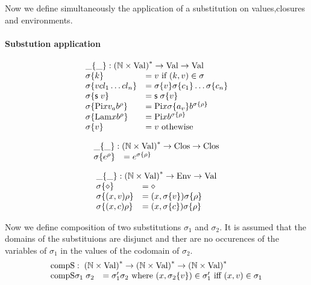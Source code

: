 Now we define simultaneously the application of a substitution on values,closures and environments.

\paragraph*{Substution application}
\[
\begin{array}{ll}
\multicolumn{2}{l}{\subst{\_}{\_} : \ves{(\cN \times \Val)} \ra \Val \ra \Val} \\
\subst{\sigma}{k} & = v \mbox{ if } (k,v) \in \sigma \\
\subst{\sigma}{v cl_1 \ldots cl_n} & = \subst{\sigma}{v} \substClos{\sigma}{c_1} \ldots \substClos{\sigma}{c_n}\\
\subst{\sigma}{\s v} & = \s \subst{\sigma}{v} \\
\subst{\sigma}{\vpi x v_a \cl{b}{\rho}} & = \vpi x \subst{\sigma}{a_v} \cl{b}{\subst{\sigma}{\rho}} \\
\subst{\sigma}{\vlam x \cl{b}{\rho}} & = \vpi x \cl{b}{\subst{\sigma}{\rho}} \\
\subst{\sigma}{v} & = v \mbox{ othewise }
\end{array}
\]

\[
\begin{array}{ll}
\multicolumn{2}{l}{\substClos{\_}{\_} : \ves{(\cN \times \Val)} \ra \Clos \ra \Clos} \\
\substClos{\sigma}{\cl{e}{\rho}} & = \cl{e}{\substEnv{\sigma}{\rho}} 
\end{array}
\]


\[
\begin{array}{ll}
\multicolumn{2}{l}{\substEnv{\_}{\_} : \ves{(\cN \times \Val)} \ra \Env \ra \Val} \\
\substEnv{\sigma}{\diamond} & = \diamond \\
\substEnv{\sigma}{(x,v)\rho} & = (x,\subst{\sigma}{v}) \substEnv{\sigma}{\rho} \\
\substEnv{\sigma}{(x,c)\rho} & = (x,\substClos{\sigma}{c}) \substEnv{\sigma}{\rho}
\end{array}
\]

Now we define composition of two substitutions $\sigma_1$ and $\sigma_2$.
It is assumed that the domains of the substituions are disjunct and
ther are no occurences of the variables of $\sigma_1$ in the values of the codomain of $\sigma_2$.  
\[
\begin{array}{ll}
\multicolumn{2}{l}{\compS : \ves{(\cN \times \Val)} \ra \ves{(\cN \times \Val)} \ra \ves{(\cN \times \Val)}} \\
\compS{\sigma_1}{\sigma_2} & =  \sigma'_1 \sigma_2 \mbox{ where } (x,\subst{\sigma_2}{v}) \in \sigma'_1 \mbox{ iff } (x,v) \in \sigma_1 \\
\end{array}
\]



